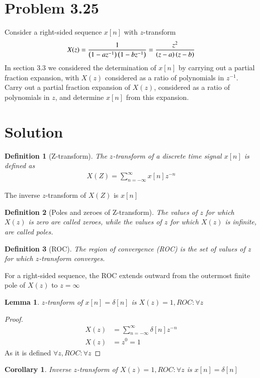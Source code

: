 \documentclass[journal,12pt,twocolumn]{IEEEtran}
\newtheorem{corollary}{Corollary}[theorem]
\newtheorem{lemma}[theorem]{Lemma}
\newtheorem{definition}{Definition}[section]
\begin{document}
\section{Problem 3.25}
Consider a right-sided sequence $x[n]$ with $z$-transform 
$$X(z)=\dfrac{1}{\left(1-az^{-1}\right)\left(1-bz^{-1}\right)}=\dfrac{z^2}{\left(z-a\right)\left(z-b\right)}$$
In section 3.3 we considered the determination of $x[n]$ by carrying out a partial fraction expansion, with $X(z)$ considered as a ratio of polynomials in $z^{-1}$. Carry out a partial fraction expansion of $X(z)$, considered as a ratio of polynomials in $z$, and determine $x[n]$ from this expansion.
\section{Solution}
\begin{definition}[Z-transform]
The $z$-transform of a discrete time signal $x[n]$ is defined as
\begin{align}
    X(Z)=\displaystyle\sum_{n=-\infty}^{\infty}x[n]z^{-n}
\end{align}
\end{definition}
\begin{remark}
The inverse $z$-transform of $X(Z)$ is $x[n]$
\end{remark}
\begin{definition}[Poles and zeroes of Z-transform]
The values of $z$ for which $X(z)$ is zero are called zeroes, while the values of $z$ for which $X(z)$ is infinite, are called poles.
\end{definition}
\begin{definition}[ROC]
The region of convergence (ROC) is the set of values of z for which $z$-transform converges.
\end{definition}
\begin{remark}
For a right-sided sequence, the ROC extends outward from the outermost finite pole of $X(z)$ to $z=\infty$
\end{remark}
\begin{lemma}
$z$-tranform of $x[n]=\delta[n]$ is $X(z)=1,ROC:\forall z$
\end{lemma}
\begin{proof}
\begin{align}
 X(z)&=\displaystyle\sum_{n=-\infty}^{\infty}\delta[n]z^{-n}\\
    X(z)&=z^{0}=1
\end{align}
As it is defined $\forall z, ROC: \forall z$
\end{proof}
\begin{corollary}
    Inverse $z$-transform of $X(z)=1,ROC:\forall z$ is $x[n]=\delta[n]$
    \label{eq:1}
\end{corollary}
\end{document}
